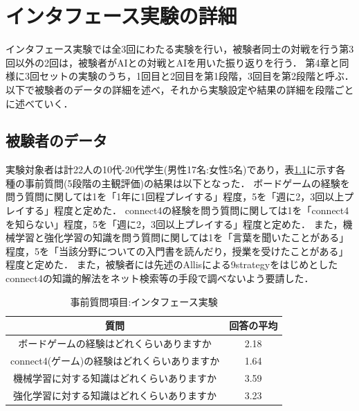 \chapter{インタフェース実験の詳細}
\label{chap:system}
インタフェース実験では全3回にわたる実験を行い，被験者同士の対戦を行う第3回以外の2回は，被験者がAIとの対戦とAIを用いた振り返りを行う．
第4章と同様に3回セットの実験のうち，1回目と2回目を第1段階，3回目を第2段階と呼ぶ．
以下で被験者のデータの詳細を述べ，それから実験設定や結果の詳細を段階ごとに述べていく．
\section{被験者のデータ}
実験対象者は計22人の10代-20代学生(男性17名:女性5名)であり，表\ref{table:before}に示す各種の事前質問(5段階の主観評価)の結果は以下となった．
ボードゲームの経験を問う質問に関しては1を「1年に1回程プレイする」程度，5を「週に2，3回以上プレイする」程度と定めた．
connect4の経験を問う質問に関しては1を「connect4を知らない」程度，5を「週に2，3回以上プレイする」程度と定めた．
また，機械学習と強化学習の知識を問う質問に関しては1を「言葉を聞いたことがある」程度，5を「当該分野についての入門書を読んだり，授業を受けたことがある」程度と定めた．
また，被験者には先述のAllis\cite{allis}による9strategyをはじめとしたconnect4の知識的解法をネット検索等の手段で調べないよう要請した．
\begin{table}[H]
    \caption{事前質問項目:インタフェース実験}
    \label{table:before}
    \centering
	\small
    \begin{tabular}{c||c}
        \multicolumn{1}{c}{質問} & 回答の平均\\ \hline \hline
        ボードゲームの経験はどれくらいありますか & 2.18\\
        connect4(ゲーム)の経験はどれくらいありますか& 1.64\\\hline
        機械学習に対する知識はどれくらいありますか& 3.59\\
        強化学習に対する知識はどれくらいありますか& 3.23\\
    \end{tabular}
    
\end{table}
